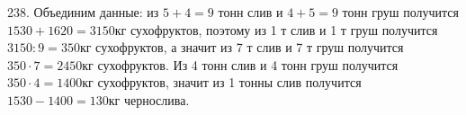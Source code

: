 238. Объединим данные: из $5+4=9$ тонн слив и $4+5=9$ тонн груш получится $1530+1620=3150$кг сухофруктов, поэтому из 1 т слив и 1 т груш получится $3150:9=350$кг сухофруктов, а значит из 7 т слив и 7 т груш получится $350\cdot7=2450$кг сухофруктов. Из 4 тонн слив и 4 тонн груш получится $350\cdot4=1400$кг сухофруктов, значит из 1 тонны слив получится $1530-1400=130$кг чернослива.\\
